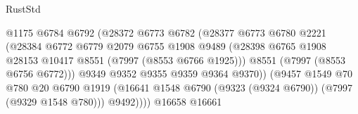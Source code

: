 \begin{lexlean}{RustStd}
\begin{coremodule}
{\begin{coremodule}
{{{{{{{{{{{{{{{{{{{{{{{{{{{{{{{{{{{{{{{{{{{                                            @1175
                                            @6784
                                            @6792
                                            (@28372
                                              @6773
                                              @6782
                                              (@28377
                                                @6773
                                                @6780
                                                @2221
                                                (@28384
                                                  @6772
                                                  @6779
                                                  @2079
                                                  @6755
                                                  @1908
                                                  @9489
                                                  (@28398
                                                    @6765
                                                    @1908
                                                    @28153
                                                    @10417
                                                    @8551
                                                    (@7997 (@8553 @6766 @1925)))
                                                  @8551
                                                  (@7997 (@8553 @6756 @6772)))
                                                @9349
                                                @9352
                                                @9355
                                                @9359
                                                @9364
                                                @9370))
                                            (@9457
                                              @1549
                                              @70
                                              @780
                                              @20
                                              @6790
                                              @1919
                                              (@16641
                                                @1548
                                                @6790
                                                (@9323 (@9324 @6790))
                                                (@7997 (@9329 @1548 @780)))
                                              @9492))))
                                      @16658
                                      @16661
}}}}}}}}}}}}}}}}}}}}}}}}}}}}}}}}}}}}}}}}}}}
\end{coremodule}}
\end{coremodule}
\end{lexlean}
